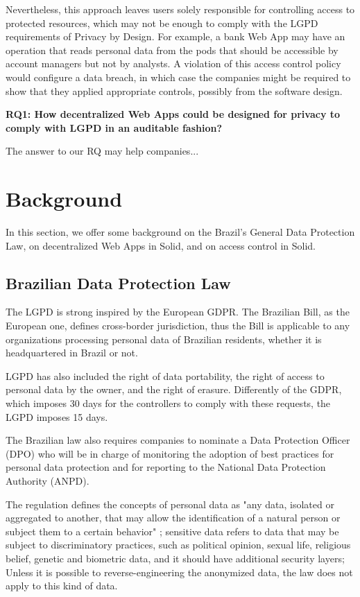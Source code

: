 \documentclass[sigconf]{acmart}
\begin{document}
Nevertheless, this approach leaves users solely responsible for controlling access to protected resources, which may not be \linebreak enough to comply with the LGPD requirements of Privacy by Design. For example, a bank Web App may have an operation that reads personal data from the pods that should be accessible by account managers but not by analysts. A violation of this access control policy would configure a data breach, in which case the companies might be required to show that they applied appropriate controls, possibly from the software design.


\vspace{0.15cm}
\noindent \textbf{RQ1: How decentralized Web Apps could be designed for privacy to comply with LGPD in an auditable fashion?}
\vspace{0.15cm}

The answer to our RQ may help companies...


\section{Background}
In this section, we offer some background on the Brazil's General Data Protection Law, on decentralized Web Apps in Solid, and on access control in Solid.

\subsection{Brazilian Data Protection Law}
The LGPD is strong inspired by the European GDPR. The Brazilian Bill, as the European one, defines cross-border jurisdiction, thus the Bill is applicable to any organizations processing personal data of Brazilian residents, whether it is headquartered in Brazil or not.

LGPD has also included the right of data portability, the right of access to personal data by the owner, and the right of erasure. Differently of the GDPR, which imposes 30 days for the controllers to comply with these requests, the LGPD imposes 15 days.

The Brazilian law also requires companies to nominate a Data Protection Officer (DPO) who will be in charge of monitoring the adoption of best practices for personal data protection and for reporting to the National Data Protection Authority (ANPD).

The regulation defines the concepts of personal data as "any data, isolated or aggregated to another, that may allow the identification of a natural person or subject them to a certain behavior" \cite{iapp2018}; sensitive data refers to data that may be subject to discriminatory practices, such as political opinion, sexual life, religious belief, genetic and biometric data, and it should have additional security layers; Unless it is possible to reverse-engineering the anonymized data, the law does not apply to this kind of data.
\end{document}
